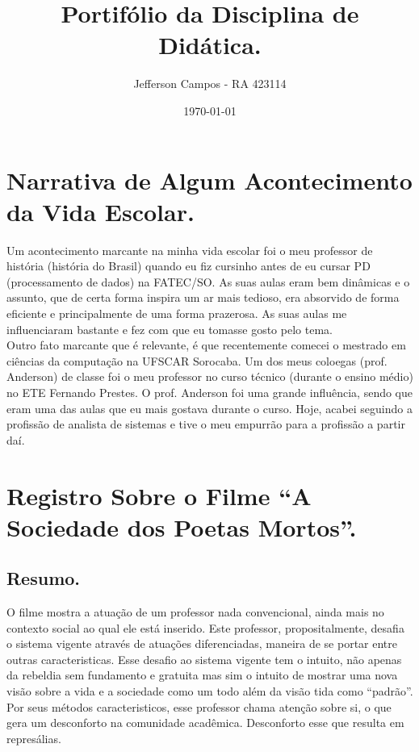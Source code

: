 \documentclass[a4paper,12pt]{article}
\title{Portifólio da Disciplina de Didática.}
\author{Jefferson Campos - RA 423114}
\date{\today}
\begin{document}
\maketitle

\newpage

\section{Narrativa de Algum Acontecimento da Vida Escolar.}

Um acontecimento marcante na minha vida escolar foi o meu professor de história (história do Brasil) quando eu fiz cursinho antes de eu cursar PD (processamento de dados) na FATEC/SO. As suas aulas eram bem dinâmicas e o assunto, que de certa forma inspira um ar mais tedioso, era absorvido de forma eficiente e principalmente de uma forma prazerosa. As suas aulas me influenciaram bastante e fez com que eu tomasse gosto pelo tema.\\
Outro fato marcante que é relevante, é que recentemente comecei o mestrado em ciências da computação na UFSCAR Sorocaba. Um dos meus coloegas (prof. Anderson) de classe foi o meu professor no curso técnico (durante o ensino médio) no ETE Fernando Prestes. O prof. Anderson foi uma grande influência, sendo que eram uma das aulas que eu mais gostava durante o curso. Hoje, acabei seguindo a profissão de analista de sistemas e tive o meu empurrão para a profissão a partir daí.

\section{Registro Sobre o Filme ``A Sociedade dos Poetas Mortos''.}

\subsection{Resumo.}

O filme mostra a atuação de um professor nada convencional, ainda mais no contexto social ao qual ele está inserido. Este professor, propositalmente, desafia o sistema vigente através de atuações diferenciadas, maneira de se portar entre outras caracteristicas. Esse desafio ao sistema vigente tem o intuito, não apenas da rebeldia sem fundamento e gratuita mas sim o intuito de mostrar uma nova visão sobre a vida e a sociedade como um todo além da visão tida como ``padrão''. Por seus métodos caracteristicos, esse professor chama atenção sobre si, o que gera um desconforto na comunidade acadêmica. Desconforto esse que resulta em represálias.
\end{document}
